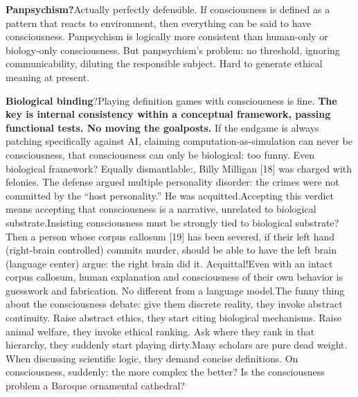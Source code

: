 \documentclass[11pt]{article}
\renewcommand{\\}[1][\mynewlineskip]{\oldnewline[#1]}
\begin{document}
\vspace{1em}
\textbf{Panpsychism?}\\
Actually perfectly defensible. If consciousness is defined as a pattern that reacts to environment, then everything can be said to have consciousness. Panpsychism is logically more consistent than human-only or biology-only consciousness. But panpsychism's problem: no threshold, ignoring communicability, diluting the responsible subject. Hard to generate ethical meaning at present.

\vspace{1em}
\textbf{Biological binding}?\\
Playing definition games with consciousness is fine. \textbf{The key is internal consistency within a conceptual framework, passing functional tests. No moving the goalposts.} If the endgame is always patching specifically against AI, claiming computation-as-simulation can never be consciousness, that consciousness can only be biological: too funny. Even biological framework? Equally dismantlable:\\
1978, Billy Milligan [18] was charged with felonies. The defense argued multiple personality disorder: the crimes were not committed by the ``host personality.'' He was acquitted.\\
Accepting this verdict means accepting that consciousness is a narrative, unrelated to biological substrate.\\
Insisting consciousness must be strongly tied to biological substrate? Then a person whose corpus callosum [19] has been severed, if their left hand (right-brain controlled) commits murder, should be able to have the left brain (language center) argue: the right brain did it. Acquittal!\\
Even with an intact corpus callosum, human explanation and consciousness of their own behavior is guesswork and fabrication. No different from a language model.\\
The funny thing about the consciousness debate: give them discrete reality, they invoke abstract continuity. Raise abstract ethics, they start citing biological mechanisms. Raise animal welfare, they invoke ethical ranking. Ask where they rank in that hierarchy, they suddenly start playing dirty.\\
Many scholars are pure dead weight. When discussing scientific logic, they demand concise definitions. On consciousness, suddenly: the more complex the better? Is the consciousness problem a Baroque ornamental cathedral?\\
\end{document}
